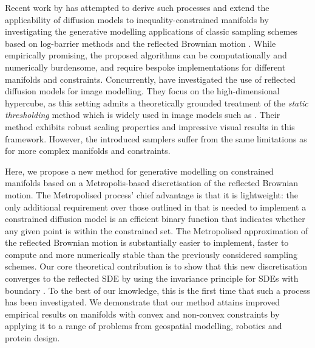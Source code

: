 Recent work by \textcite{fishman2023diffusion} has attempted to derive such processes and extend the applicability of diffusion models to inequality-constrained manifolds by investigating the generative modelling applications of classic sampling schemes based on log-barrier methods \parencite{Kannan2009,lee2017Geodesic,noble2022Barrier,kook2022sampling,gatmiry2022convergence,lee2018convergence} and the reflected Brownian motion \parencite{williams1987Reflected,petit1997Time,shkolnikov2013Timereversal}.
While empirically promising, the proposed algorithms can be computationally and numerically burdensome, and require bespoke implementations for different manifolds and constraints.
Concurrently, \textcite{lou2023reflected} have investigated the use of reflected diffusion models for image modelling.
They focus on the high-dimensional hypercube, as this setting admits a theoretically grounded treatment of the \emph{static thresholding} method which is widely used in image models such as \textcite{saharia2022photorealistic}.
Their method exhibits robust scaling properties and impressive visual results in this framework.
However, the introduced samplers suffer from the same limitations as \textcite{fishman2023diffusion} for more complex manifolds and constraints.

Here, we propose a new method for generative modelling on constrained manifolds based on a Metropolis-based discretisation of the reflected Brownian motion.
The Metropolised process' chief advantage is that it is lightweight: the only additional requirement over those outlined in \textcite{de2022riemannian} that is needed to implement a constrained diffusion model is an efficient binary function that indicates whether any given point is within the constrained set.
The Metropolised approximation of the reflected Brownian motion is substantially easier to implement, faster to compute and more numerically stable than the previously considered sampling schemes.
Our core theoretical contribution is to show that this new discretisation converges to the reflected SDE by using the invariance principle for SDEs with boundary \parencite{stroock1971diffusion}.
To the best of our knowledge, this is the first time that such a process has been investigated.
We demonstrate that our method attains improved empirical results on manifolds with convex and non-convex constraints by applying it to a range of problems from geospatial modelling, robotics and protein design.

